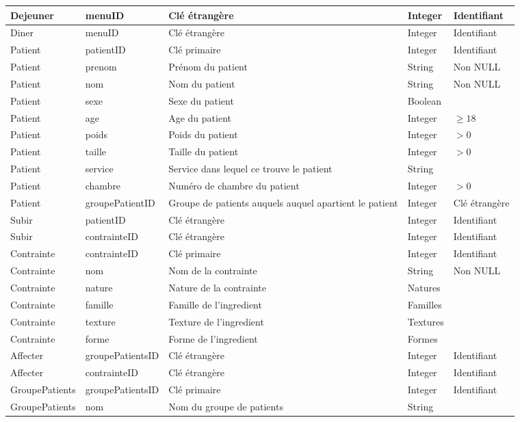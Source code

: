\begin{longtable}{llp{5cm}ll}
  Dejeuner & menuID & Clé étrangère & Integer & Identifiant \\ \hline
  Diner & menuID & Clé étrangère & Integer & Identifiant \\ \hline
  Patient & patientID & Clé primaire & Integer & Identifiant \\
  Patient & prenom & Prénom du patient & String & Non NULL\\
  Patient & nom & Nom du patient & String & Non NULL\\
  Patient & sexe & Sexe du patient & Boolean & \\
  Patient & age & Age du patient & Integer & $\geqslant 18$\\ %
  Patient & poids & Poids du patient & Integer & $> 0$ \\
  Patient & taille & Taille du patient & Integer & $> 0$ \\
  Patient & service & Service dans lequel ce trouve le patient & String & \\
  Patient & chambre & Numéro de chambre du patient & Integer & $> 0$ \\
  Patient & groupePatientID &  Groupe de patients auquels auquel apartient le patient & Integer & Clé étrangère \\ \hline
  Subir & patientID & Clé étrangère & Integer & Identifiant \\
  Subir & contrainteID & Clé étrangère & Integer & Identifiant \\ \hline
  Contrainte & contrainteID & Clé primaire & Integer & Identifiant \\
  Contrainte & nom & Nom de la contrainte & String & Non NULL \\
  Contrainte & nature & Nature de la contrainte & Natures & \\
  Contrainte & famille & Famille de l'ingredient & Familles & \\
  Contrainte & texture & Texture de l'ingredient & Textures & \\
  Contrainte & forme & Forme de l'ingredient & Formes & \\ \hline
  Affecter & groupePatientsID & Clé étrangère & Integer & Identifiant \\
  Affecter & contrainteID & Clé étrangère & Integer & Identifiant \\ \hline
  GroupePatients & groupePatientsID & Clé primaire & Integer & Identifiant \\
  GroupePatients & nom & Nom du groupe de patients & String & \\ \hline

\end{longtable}
